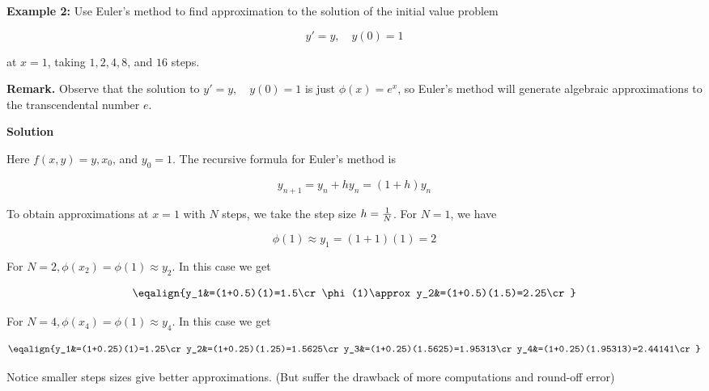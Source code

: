 \nopagenumbers
{\bf Example 2:} Use Euler's method to find approximation to the solution of the initial value problem

$$y'=y,\quad y(0)=1$$

at $x=1$, taking $1,2,4,8$, and $16$ steps.

\vskip 2mm
{\bf Remark.} Observe that the solution to $y'=y,\quad y(0)=1$ is just $\phi(x)=e^x$, so Euler's method will generate algebraic approximations to the transcendental number $e$.

\vskip 10pt
{\bf Solution}

\vskip 6pt
Here $f(x,y)=y,x_0$, and $y_0=1$. The recursive formula for Euler's method is

$$y_{n+1}=y_n+hy_n=(1+h)y_n$$

To obtain approximations at $x=1$ with $N$ steps, we take the step size $h={1\over N}$. For $N=1$, we have

$$\phi(1)\approx y_1=(1+1)(1)=2$$

For $N=2,\phi(x_2)=\phi(1)\approx y_2$. In this case we get

$$\eqalign{y_1&=(1+0.5)(1)=1.5\cr
	\phi(1)\approx y_2&=(1+0.5)(1.5)=2.25\cr}$$

For $N=4,\phi(x_4)=\phi(1)\approx y_4$. In this case we get

$$\eqalign{y_1&=(1+0.25)(1)=1.25\cr
	y_2&=(1+0.25)(1.25)=1.5625\cr
	y_3&=(1+0.25)(1.5625)=1.95313\cr
	y_4&=(1+0.25)(1.95313)=2.44141\cr}$$

Notice smaller steps sizes give better approximations. (But suffer the drawback of more computations and round-off error)

\vfill\eject
\bye
